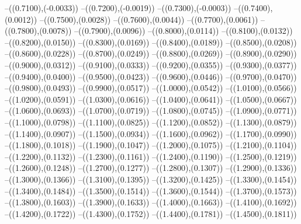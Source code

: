 {	--({\sx*(0.7100)},{\sy*(-0.0033)})
	--({\sx*(0.7200)},{\sy*(-0.0019)})
	--({\sx*(0.7300)},{\sy*(-0.0003)})
	--({\sx*(0.7400)},{\sy*(0.0012)})
	--({\sx*(0.7500)},{\sy*(0.0028)})
	--({\sx*(0.7600)},{\sy*(0.0044)})
	--({\sx*(0.7700)},{\sy*(0.0061)})
	--({\sx*(0.7800)},{\sy*(0.0078)})
	--({\sx*(0.7900)},{\sy*(0.0096)})
	--({\sx*(0.8000)},{\sy*(0.0114)})
	--({\sx*(0.8100)},{\sy*(0.0132)})
	--({\sx*(0.8200)},{\sy*(0.0150)})
	--({\sx*(0.8300)},{\sy*(0.0169)})
	--({\sx*(0.8400)},{\sy*(0.0189)})
	--({\sx*(0.8500)},{\sy*(0.0208)})
	--({\sx*(0.8600)},{\sy*(0.0228)})
	--({\sx*(0.8700)},{\sy*(0.0249)})
	--({\sx*(0.8800)},{\sy*(0.0269)})
	--({\sx*(0.8900)},{\sy*(0.0290)})
	--({\sx*(0.9000)},{\sy*(0.0312)})
	--({\sx*(0.9100)},{\sy*(0.0333)})
	--({\sx*(0.9200)},{\sy*(0.0355)})
	--({\sx*(0.9300)},{\sy*(0.0377)})
	--({\sx*(0.9400)},{\sy*(0.0400)})
	--({\sx*(0.9500)},{\sy*(0.0423)})
	--({\sx*(0.9600)},{\sy*(0.0446)})
	--({\sx*(0.9700)},{\sy*(0.0470)})
	--({\sx*(0.9800)},{\sy*(0.0493)})
	--({\sx*(0.9900)},{\sy*(0.0517)})
	--({\sx*(1.0000)},{\sy*(0.0542)})
	--({\sx*(1.0100)},{\sy*(0.0566)})
	--({\sx*(1.0200)},{\sy*(0.0591)})
	--({\sx*(1.0300)},{\sy*(0.0616)})
	--({\sx*(1.0400)},{\sy*(0.0641)})
	--({\sx*(1.0500)},{\sy*(0.0667)})
	--({\sx*(1.0600)},{\sy*(0.0693)})
	--({\sx*(1.0700)},{\sy*(0.0719)})
	--({\sx*(1.0800)},{\sy*(0.0745)})
	--({\sx*(1.0900)},{\sy*(0.0771)})
	--({\sx*(1.1000)},{\sy*(0.0798)})
	--({\sx*(1.1100)},{\sy*(0.0825)})
	--({\sx*(1.1200)},{\sy*(0.0852)})
	--({\sx*(1.1300)},{\sy*(0.0879)})
	--({\sx*(1.1400)},{\sy*(0.0907)})
	--({\sx*(1.1500)},{\sy*(0.0934)})
	--({\sx*(1.1600)},{\sy*(0.0962)})
	--({\sx*(1.1700)},{\sy*(0.0990)})
	--({\sx*(1.1800)},{\sy*(0.1018)})
	--({\sx*(1.1900)},{\sy*(0.1047)})
	--({\sx*(1.2000)},{\sy*(0.1075)})
	--({\sx*(1.2100)},{\sy*(0.1104)})
	--({\sx*(1.2200)},{\sy*(0.1132)})
	--({\sx*(1.2300)},{\sy*(0.1161)})
	--({\sx*(1.2400)},{\sy*(0.1190)})
	--({\sx*(1.2500)},{\sy*(0.1219)})
	--({\sx*(1.2600)},{\sy*(0.1248)})
	--({\sx*(1.2700)},{\sy*(0.1277)})
	--({\sx*(1.2800)},{\sy*(0.1307)})
	--({\sx*(1.2900)},{\sy*(0.1336)})
	--({\sx*(1.3000)},{\sy*(0.1366)})
	--({\sx*(1.3100)},{\sy*(0.1395)})
	--({\sx*(1.3200)},{\sy*(0.1425)})
	--({\sx*(1.3300)},{\sy*(0.1454)})
	--({\sx*(1.3400)},{\sy*(0.1484)})
	--({\sx*(1.3500)},{\sy*(0.1514)})
	--({\sx*(1.3600)},{\sy*(0.1544)})
	--({\sx*(1.3700)},{\sy*(0.1573)})
	--({\sx*(1.3800)},{\sy*(0.1603)})
	--({\sx*(1.3900)},{\sy*(0.1633)})
	--({\sx*(1.4000)},{\sy*(0.1663)})
	--({\sx*(1.4100)},{\sy*(0.1692)})
	--({\sx*(1.4200)},{\sy*(0.1722)})
	--({\sx*(1.4300)},{\sy*(0.1752)})
	--({\sx*(1.4400)},{\sy*(0.1781)})
	--({\sx*(1.4500)},{\sy*(0.1811)})
}
